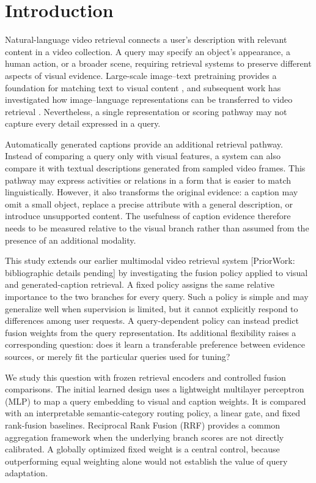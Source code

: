 \section{Introduction}

Natural-language video retrieval connects a user's description with relevant content in a video collection. A query may specify an object's appearance, a human action, or a broader scene, requiring retrieval systems to preserve different aspects of visual evidence. Large-scale image--text pretraining provides a foundation for matching text to visual content \cite{radford2021clip}, and subsequent work has investigated how image--language representations can be transferred to video retrieval \cite{luo2021clip4clip}. Nevertheless, a single representation or scoring pathway may not capture every detail expressed in a query.

Automatically generated captions provide an additional retrieval pathway. Instead of comparing a query only with visual features, a system can also compare it with textual descriptions generated from sampled video frames. This pathway may express activities or relations in a form that is easier to match linguistically. However, it also transforms the original evidence: a caption may omit a small object, replace a precise attribute with a general description, or introduce unsupported content. The usefulness of caption evidence therefore needs to be measured relative to the visual branch rather than assumed from the presence of an additional modality.

This study extends our earlier multimodal video retrieval system [PriorWork: bibliographic details pending] by investigating the fusion policy applied to visual and generated-caption retrieval. A fixed policy assigns the same relative importance to the two branches for every query. Such a policy is simple and may generalize well when supervision is limited, but it cannot explicitly respond to differences among user requests. A query-dependent policy can instead predict fusion weights from the query representation. Its additional flexibility raises a corresponding question: does it learn a transferable preference between evidence sources, or merely fit the particular queries used for tuning?

We study this question with frozen retrieval encoders and controlled fusion comparisons. The initial learned design uses a lightweight multilayer perceptron (MLP) to map a query embedding to visual and caption weights. It is compared with an interpretable semantic-category routing policy, a linear gate, and fixed rank-fusion baselines. Reciprocal Rank Fusion (RRF) \cite{cormack2009rrf} provides a common aggregation framework when the underlying branch scores are not directly calibrated. A globally optimized fixed weight is a central control, because outperforming equal weighting alone would not establish the value of query adaptation.

